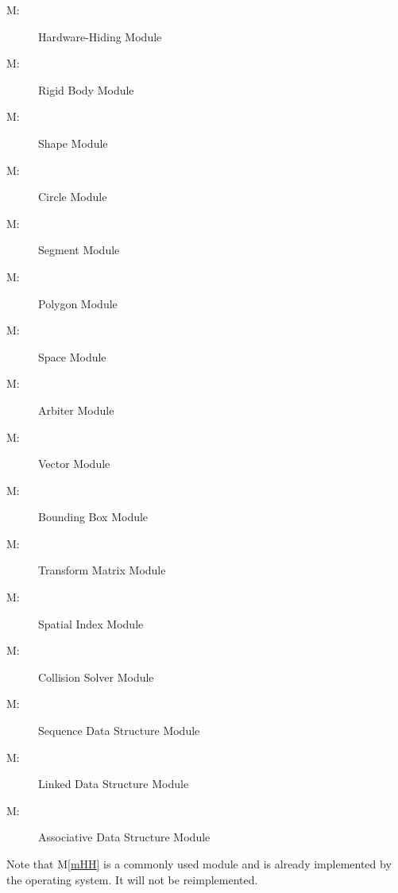 \documentclass[12pt]{article}
\newcounter{mnum}
\newcommand{\mthemnum}{M\themnum}
\newcommand{\mref}[1]{M\ref{#1}}
\begin{document}
\begin{description}
\item [ \mthemnum \label{mHH}:] Hardware-Hiding Module 
\item [ \mthemnum \label{mBody}:] Rigid Body Module 
\item [ \mthemnum \label{mShape}:] Shape Module 
\item [ \mthemnum \label{mCircle}:] Circle Module
\item [ \mthemnum \label{mSegment}:] Segment Module
\item [ \mthemnum \label{mPoly}:] Polygon Module
\item [ \mthemnum \label{mSpace}:] Space Module 
\item [ \mthemnum \label{mCollision}:] Arbiter Module 
\item [ \mthemnum \label{mVector}:] Vector Module
\item [ \mthemnum \label{mBBox}:] Bounding Box Module
\item [ \mthemnum \label{mTrans}:] Transform Matrix Module
\item [ \mthemnum \label{mSpatialIndex}:] Spatial Index Module
\item [ \mthemnum \label{mSolver}:] Collision Solver Module 
\item [ \mthemnum \label{mSeqDS}:] Sequence Data Structure Module
\item [ \mthemnum \label{mLinkDS}:] Linked Data Structure Module  
\item [ \mthemnum \label{mAssocDS}:] Associative Data Structure Module 
\end{description}
\noindent
Note that \mref{mHH} is a commonly used module and is already implemented by the operating
system.  It will not be reimplemented.
\end{document}

